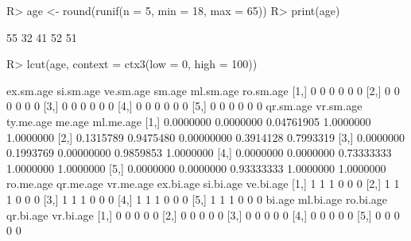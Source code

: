 \begin{Schunk}
% --begin: "lcut.numeric"
\begin{Sinput}
R> age <- round(runif(n = 5, min = 18, max = 65))
R> print(age)
\end{Sinput}
\begin{Soutput}
[1] 55 32 41 52 51
\end{Soutput}
\begin{Sinput}
R> lcut(age, context = ctx3(low = 0, high = 100))
\end{Sinput}
\begin{Soutput}
     ex.sm.age si.sm.age ve.sm.age sm.age ml.sm.age ro.sm.age
[1,]         0         0         0      0         0         0
[2,]         0         0         0      0         0         0
[3,]         0         0         0      0         0         0
[4,]         0         0         0      0         0         0
[5,]         0         0         0      0         0         0
     qr.sm.age vr.sm.age  ty.me.age    me.age ml.me.age
[1,] 0.0000000 0.0000000 0.04761905 1.0000000 1.0000000
[2,] 0.1315789 0.9475480 0.00000000 0.3914128 0.7993319
[3,] 0.0000000 0.1993769 0.00000000 0.9859853 1.0000000
[4,] 0.0000000 0.0000000 0.73333333 1.0000000 1.0000000
[5,] 0.0000000 0.0000000 0.93333333 1.0000000 1.0000000
     ro.me.age qr.me.age vr.me.age ex.bi.age si.bi.age ve.bi.age
[1,]         1         1         1         0         0         0
[2,]         1         1         1         0         0         0
[3,]         1         1         1         0         0         0
[4,]         1         1         1         0         0         0
[5,]         1         1         1         0         0         0
     bi.age ml.bi.age ro.bi.age qr.bi.age vr.bi.age
[1,]      0         0         0         0         0
[2,]      0         0         0         0         0
[3,]      0         0         0         0         0
[4,]      0         0         0         0         0
[5,]      0         0         0         0         0
\end{Soutput}
%
% --end: "lcut.numeric"
\end{Schunk}
